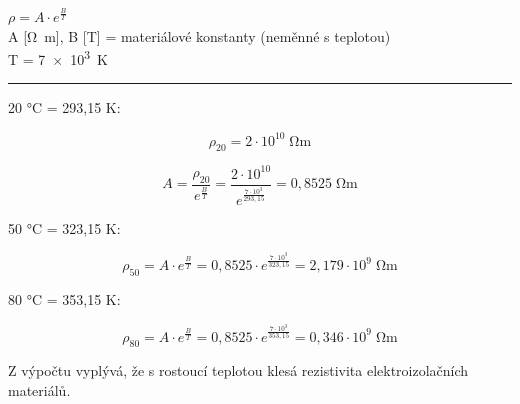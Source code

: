 
$\rho = A \cdot e^\frac{B}{T}$\\
A [\si{\ohm\meter}], B [\si{\tesla}] = materiálové konstanty (neměnné s teplotou)\\
T = \SI{7e3}{\kelvin}\\
\noindent\rule{8cm}{0.4pt}

20 \si{\celsius} = 293,15 \si{\kelvin}:

\begin{equation*}
    \rho_{20} = 2 \cdot 10^{10} \; \si{\ohm\meter}
\end{equation*}

\begin{equation*}
    A = \frac{\rho_{20}}{e^\frac{B}{T}} = \frac{2 \cdot 10^{10}}{e^\frac{7 \cdot 10^3}{293,15}} = 0,8525 \; \si{\ohm\meter}
\end{equation*}

50 \si{\celsius} = 323,15 \si{\kelvin}:

\begin{equation*}
    \rho_{50} = A \cdot e^\frac{B}{T} = 0,8525 \cdot e^\frac{7 \cdot 10^3}{323,15} = 2,179 \cdot 10^9 \; \si{\ohm\meter}
\end{equation*}

80 \si{\celsius} = 353,15 \si{\kelvin}:

\begin{equation*}
    \rho_{80} = A \cdot e^\frac{B}{T} = 0,8525 \cdot e^\frac{7 \cdot 10^3}{353,15} = 0,346 \cdot 10^9 \; \si{\ohm\meter}
\end{equation*}

Z výpočtu vyplývá, že s rostoucí teplotou klesá rezistivita elektroizolačních materiálů.

\newpage



